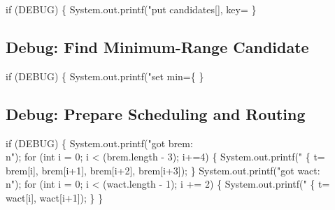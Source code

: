 \nwenddocs{}\endmoddef\nwstartdeflinemarkup{}\nwenddeflinemarkup
if (DEBUG) \{
  System.out.printf("put candidates[], key=%
\}
\nwendcode{}\nwdocspar

\subsection{Debug: Find Minimum-Range Candidate}

\nwenddocs{}\endmoddef\nwstartdeflinemarkup{}\nwenddeflinemarkup
if (DEBUG) \{
  System.out.printf("set min=\{ %
\}
\nwendcode{}\nwdocspar

\subsection{Debug: Prepare Scheduling and Routing}
\nwenddocs{}\endmoddef\nwstartdeflinemarkup{}\nwenddeflinemarkup
if (DEBUG) \{
  System.out.printf("got brem: \\n");
  for (int i = 0; i < (brem.length - 3); i+=4) \{
    System.out.printf("  \{ t=%
        brem[i], brem[i+1], brem[i+2], brem[i+3]);
  \}
  System.out.printf("got wact: \\n");
  for (int i = 0; i < (wact.length - 1); i += 2) \{
    System.out.printf("  \{ t=%
      wact[i], wact[i+1]);
  \}
\}
\nwendcode{}\nwdocspar

